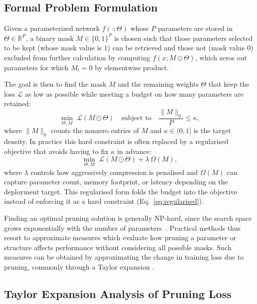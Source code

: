 \subsection{Formal Problem Formulation}
\label{subsec:pruning_formal_problem}

Given a parameterized network $f(\cdot;\Theta)$ whose $P$ parameters are
stored in $\Theta \in \mathbb{R}^P$, a binary mask $M \in \{0,1\}^P$ is
chosen such that those parameters selected to be kept (whose mask value is
$1$) can be retrieved and those not (mask value $0$) excluded from further
calculation by computing $f(x; M \odot \Theta)$, which zeros out parameters
for which $M_i = 0$ by elementwise product.

The goal is then to find the mask $M$ and the remaining weights $\Theta$ that
keep the loss $\mathcal{L}$ as low as possible while meeting a budget on how
many parameters are retained:
\begin{equation}
	\min_{\Theta, M}\; \mathcal{L}(M \odot \Theta)
	\quad
	\text{subject to}
	\quad
	\frac{\lVert M \rVert_0}{P} \le \kappa,
	\label{eq:constrained}
\end{equation}
where $\lVert M \rVert_0$ counts the nonzero entries of $M$ and $\kappa \in
(0,1]$ is the target density. In practice this hard constraint is often
replaced by a regularised objective that avoids having to fix $\kappa$ in
advance:
\begin{equation}
	\min_{\Theta, M}\; \mathcal{L}(M \odot \Theta) + \lambda\,\Omega(M),
	\label{eq:regularised}
\end{equation}
where $\lambda$ controls how aggressively compression is penalised and
$\Omega(M)$ can capture parameter count, memory footprint, or latency
depending on the deployment target. This regularised form folds the budget into the objective instead of enforcing it as a hard constraint (Eq.~\eqref{eq:regularised}).

Finding an optimal pruning solution is generally NP-hard, since the search
space grows exponentially with the number of parameters~\cite{dong2017learning}.
Practical methods thus resort to approximate measures which evaluate how pruning a parameter or structure affects performance without considering all possible masks. Such measures can be obtained by approximating the change in training loss due to pruning, commonly through a Taylor expansion \cite{molchanov2017variational}.

\subsection{Taylor Expansion Analysis of Pruning Loss}
\label{subsec:taylor_pruning_loss}

